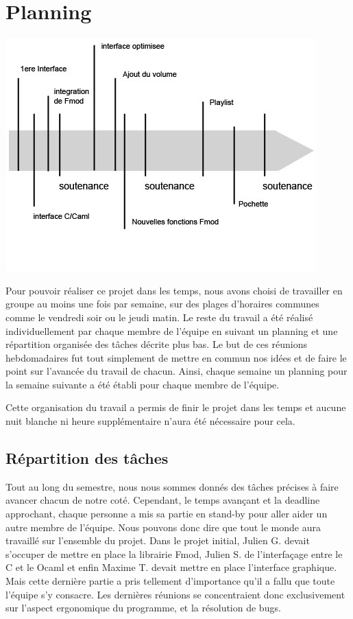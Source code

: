 \documentclass[12pt,a4paper]{report}
\begin{document}
\chapter{Planning}

\begin{center}
\includegraphics[scale =0.8]{frise.jpg}
\end{center}

Pour pouvoir réaliser ce projet dans les temps, nous avons choisi de travailler en groupe au moins une fois par semaine, sur des plages d'horaires communes comme le vendredi soir ou le jeudi matin. Le reste du travail a été réalisé individuellement par chaque membre de l'équipe en suivant un planning et une répartition organisée des tâches décrite plus bas. Le but de ces réunions hebdomadaires fut tout simplement de mettre en commun nos idées et de faire le point sur l'avancée du travail de chacun. Ainsi, chaque semaine un planning pour la semaine suivante a été établi pour chaque membre de l'équipe.

Cette organisation du travail a permis de finir le projet dans les temps et aucune nuit blanche ni heure supplémentaire n'aura été nécessaire pour cela.

\section{Répartition des tâches}

Tout au long du semestre, nous nous sommes donnés des tâches précises à faire avancer chacun de notre coté. Cependant, le temps avançant et la deadline approchant, chaque personne a mis sa partie en stand-by pour aller aider un autre membre de l'équipe. Nous pouvons donc dire que tout le monde aura travaillé sur l'ensemble du projet.
Dans le projet initial, Julien G. devait s'occuper de mettre en place la librairie Fmod, Julien S. de l'interfaçage entre le C et le Ocaml et enfin Maxime T. devait mettre en place l'interface graphique. Mais cette dernière partie a pris tellement d'importance qu'il a fallu que toute l'équipe s'y consacre.
Les dernières réunions se concentraient donc exclusivement sur l'aspect ergonomique du programme, et la résolution de bugs.
\end{document}

